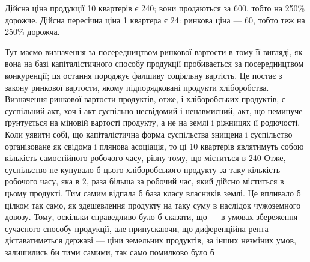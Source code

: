 \noindent{}Дійсна ціна продукції 10 квартерів є 240; вони продаються за 600, тобто на 250\% дорожче.
Дійсна пересічна ціна 1 квартера є 24: ринкова ціна — 60, тобто теж на 250\% дорожча.

Тут маємо визначення за посередництвом ринкової вартости в тому її вигляді, як вона на базі
капіталістичного способу продукції пробивається за посередництвом конкуренції; ця остання породжує
фалшиву соціяльну вартість. Це постає з закону ринкової вартости, якому підпорядковані продукти
хліборобства.
Визначення ринкової вартости продуктів, отже, і хліборобських продуктів, є суспільний акт, хоч і акт
суспільно несвідомий і ненавмисний, акт, що неминуче ґрунтується на міновій вартості продукту, а не
на землі і ріжницях її родючості. Коли уявити собі, що капіталістична форма суспільства знищена і
суспільство організоване як свідома і плянова асоціація, то ці 10 квартерів являтимуть собою
кількість самостійного робочого часу, рівну тому, що міститься в 240 Отже, суспільство не
купувало б цього хліборобського продукту за таку кількість робочого часу, яка в 2, раза більша
за робочий час, який дійсно міститься в цьому продукті. Тим самим відпала б база класу власників
землі. Це впливало б цілком так само, як здешевлення продукту на таку суму в наслідок чужоземного
довозу. Тому, оскільки справедливо було б сказати, що — в умовах збереження сучасного способу
продукції, але припускаючи, що диференційна рента діставатиметься державі — ціни земельних
продуктів, за інших незміних умов, залишились би тими самими, так само помилково було б
\parbreak{}  %
